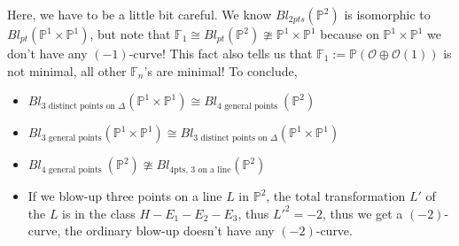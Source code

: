 \documentclass[../main.tex]{subfiles}
\begin{document}
\begin{remark}
Here, we have to be a little bit careful. We know $Bl_{2pts}(\mathbb{P}^{2})$ is isomorphic to $Bl_{pt}(\mathbb{P}^{1}\times \mathbb{P}^{1})$, but note that $\mathbb{F}_{1}\cong Bl_{pt}(\mathbb{P}^{2})\ncong \mathbb{P}^{1}\times \mathbb{P}^{1}$ because on $\mathbb{P}^{1}\times \mathbb{P}^{1}$ we don't have any $(-1)$-curve! This fact also tells us that $\mathbb{F}_{1}:=\mathbb{P}(\mathcal{O}\oplus\mathcal{O}(1))$ is not minimal, all other $\mathbb{F}_{n}$'s are minimal! To conclude,
\begin{itemize}
\item $Bl_{\text{$3$ distinct points on $\Delta$}}(\mathbb{P}^{1}\times \mathbb{P}^{1})\cong Bl_{\text{$4$ general points }}(\mathbb{P}^{2})$
\item $Bl_{\text{$3$ general points}}(\mathbb{P}^{1}\times \mathbb{P}^{1})\cong Bl_{\text{$3$ distinct points on $\Delta$}}(\mathbb{P}^{1}\times \mathbb{P}^{1})$
\item $Bl_{\text{$4$ general points }}(\mathbb{P}^{2})\ncong Bl_{\text{4pts, 3 on a line}}(\mathbb{P}^{2})$
\item If we blow-up three  points on a line $L$ in $\mathbb{P}^{2}$, the total transformation $L'$ of the $L$ is in the class $H-E_{1}-E_{2}-E_{3}$, thus $L'^{2}=-2$, thus we get a $(-2)$-curve, the ordinary blow-up doesn't have any $(-2)$-curve. 

\end{itemize}
\end{remark}




\end{document}
